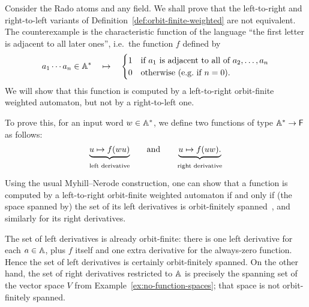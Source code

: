 \begin{example}
    Consider the Rado atoms and any field. 
    We shall prove that the left-to-right and right-to-left variants of Definition~\ref{def:orbit-finite-weighted} are not equivalent. 
    The counterexample is the characteristic function of the language ``the first letter is adjacent to all later ones'', 
    i.e.~the function $f$ defined by 
    \begin{align*}
        a_1 \cdots a_n \in \mathbb{A}^* \quad \mapsto \quad 
        \begin{cases}
            1 & \text{if $a_1$ is adjacent to all of $a_2,\ldots,a_{n}$}\\
            0 & \text{otherwise (e.g.~if $n = 0$).}
        \end{cases}
    \end{align*}
    We will show that this function is computed by a left-to-right orbit-finite weighted automaton, but not by a right-to-left one. 
    
    To prove this, for an input word $w \in \mathbb{A}^*$, we define two functions of type $\mathbb{A}^* \to \mathsf{F}$ as follows:
    \begin{align*}
        \myunderbrace{u \mapsto f(wu)}{left derivative}
        \quad \text{and} \quad 
        \myunderbrace{u \mapsto f(uw).}{right derivative}
    \end{align*}
    Using the usual Myhill--Nerode construction, 
    one can show that a function is computed by a left-to-right orbit-finite weighted automaton 
    if and only if (the space spanned by) the set of its left derivatives is orbit-finitely spanned~\cite[Thm.~6.19]{aliceBob}, 
    and similarly for its right derivatives. 

    The set of left derivatives is already orbit-finite: 
    there is one left derivative for each $a \in \mathbb{A}$, plus $f$ itself and one extra derivative for the always-zero function. 
    Hence the set of left derivatives is certainly orbit-finitely spanned.
    On the other hand, the set of right derivatives restricted to $\mathbb{A}$ is precisely the spanning set of the vector space $V$ from Example~\ref{ex:no-function-spaces}; 
    that space is not orbit-finitely spanned.
\lipicsEnd\end{example}

